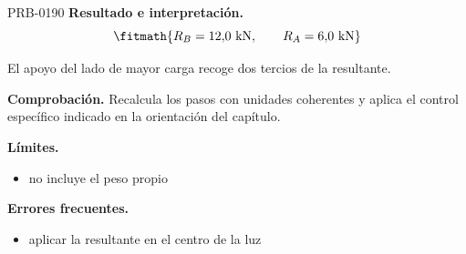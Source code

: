 \begin{studiumworked}{PRB-0190}
\textbf{Resultado e interpretación.}\[\fitmath{R_B = 12{,}0\ \mathrm{kN},\qquad R_A = 6{,}0\ \mathrm{kN}}\]

El apoyo del lado de mayor carga recoge dos tercios de la resultante.

\par\textbf{Comprobación.} Recalcula los pasos con unidades coherentes y aplica el control específico indicado en la orientación del capítulo.

\textbf{Límites.}\begin{itemize}\item no incluye el peso propio\end{itemize}

\textbf{Errores frecuentes.}\begin{itemize}\item aplicar la resultante en el centro de la luz\end{itemize}

\end{studiumworked}

\Needspace{.3\textheight}

